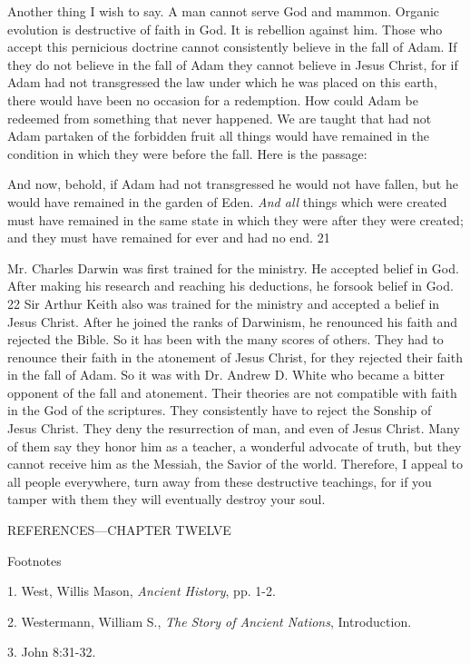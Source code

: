 Another thing I wish to say. A man cannot serve God and mammon. Organic evolution is
destructive of faith in God. It is rebellion against him. Those who accept this pernicious
doctrine cannot consistently believe in the fall of Adam. If they do not believe in the fall of
Adam they cannot believe in Jesus Christ, for if Adam had not transgressed the law under
which he was placed on this earth, there would have been no occasion for a redemption. How
could Adam be redeemed from something that never happened. We are taught that had not
Adam partaken of the forbidden fruit all things would have remained in the condition in
which they were before the fall. Here is the passage:

And now, behold, if Adam had not transgressed he would not have fallen, but he would have
remained in the garden of Eden. \textit{And all} things which were created must have remained in
the same state in which they were after they were created; and they must have remained for
ever and had no end. 21

Mr. Charles Darwin was first trained for the ministry. He accepted belief in God. After
making his research and reaching his deductions, he forsook belief in God. 22 Sir Arthur
Keith also was trained for the ministry and accepted a belief in Jesus Christ. After he joined
the ranks of Darwinism, he renounced his faith and rejected the Bible. So it has been with the
many scores of others. They had to renounce their faith in the atonement of Jesus Christ, for
they rejected their faith in the fall of Adam. So it was with Dr. Andrew D. White who
became a bitter opponent of the fall and atonement. Their theories are not compatible with
faith in the God of the scriptures. They consistently have to reject the Sonship of Jesus
Christ. They deny the resurrection of man, and even of Jesus Christ. Many of them say they
honor him as a teacher, a wonderful advocate of truth, but they cannot receive him as the
Messiah, the Savior of the world. Therefore, I appeal to all people everywhere, turn away
from these destructive teachings, for if you tamper with them they will eventually destroy
your soul.

\newpage
REFERENCES—CHAPTER TWELVE

Footnotes

1. West, Willis Mason, \textit{Ancient History}, pp. 1-2.

2. Westermann, William S., \textit{The Story of Ancient Nations}, Introduction.

3. John 8:31-32.

